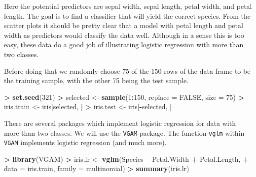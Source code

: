 \documentclass[]{krantz}
\makeatletter
\newenvironment{Shaded}{\begin{snugshade}}{\end{snugshade}}
\newcommand{\DataTypeTok}[1]{\textcolor[rgb]{0.27,0.27,0.27}{#1}}
\newcommand{\DecValTok}[1]{\textcolor[rgb]{0.06,0.06,0.06}{#1}}
\newcommand{\KeywordTok}[1]{\textcolor[rgb]{0.27,0.27,0.27}{\textbf{#1}}}
\newcommand{\NormalTok}[1]{#1}
\newcommand{\OperatorTok}[1]{\textcolor[rgb]{0.43,0.43,0.43}{\textbf{#1}}}
\newcommand{\OtherTok}[1]{\textcolor[rgb]{0.37,0.37,0.37}{#1}}
\newcommand{\StringTok}[1]{\textcolor[rgb]{0.5,0.5,0.5}{#1}}
\newenvironment{kframe}{%
\medskip{}
\setlength{\fboxsep}{.8em}
 \def\at@end@of@kframe{}%
 \ifinner\ifhmode%
  \def\at@end@of@kframe{\end{minipage}}%
  \begin{minipage}{\columnwidth}%
 \fi\fi%
 \def\FrameCommand##1{\hskip\@totalleftmargin \hskip-\fboxsep
 \colorbox{shadecolor}{##1}\hskip-\fboxsep
     \hskip-\linewidth \hskip-\@totalleftmargin \hskip\columnwidth}%
 \MakeFramed {\advance\hsize-\width
   \@totalleftmargin\z@ \linewidth\hsize
   \@setminipage}}%
 {\par\unskip\endMakeFramed%
 \at@end@of@kframe}
\renewenvironment{Shaded}{\begin{kframe}}{\end{kframe}}
\makeatother
\begin{document}
Here the potential predictors are sepal width, sepal length, petal width, and petal length. The goal is to find a classifier that will yield the correct species. From the scatter plots it should be pretty clear that a model with petal length and petal width as predictors would classify the data well. Although in a sense this is too easy, these data do a good job of illustrating logistic regression with more than two classes.

Before doing that we randomly choose 75 of the 150 rows of the data frame to be the training sample, with the other 75 being the test sample.

\begin{Shaded}
\begin{Highlighting}[]
\OperatorTok{>}\StringTok{ }\KeywordTok{set.seed}\NormalTok{(}\DecValTok{321}\NormalTok{)}
\OperatorTok{>}\StringTok{ }\NormalTok{selected <-}\StringTok{ }\KeywordTok{sample}\NormalTok{(}\DecValTok{1}\OperatorTok{:}\DecValTok{150}\NormalTok{, }\DataTypeTok{replace =} \OtherTok{FALSE}\NormalTok{, }\DataTypeTok{size =} \DecValTok{75}\NormalTok{)}
\OperatorTok{>}\StringTok{ }\NormalTok{iris.train <-}\StringTok{ }\NormalTok{iris[selected, ]}
\OperatorTok{>}\StringTok{ }\NormalTok{iris.test <-}\StringTok{ }\NormalTok{iris[}\OperatorTok{-}\NormalTok{selected, ]}
\end{Highlighting}
\end{Shaded}

There are several packages which implement logistic regression for data with more than two classes. We will use the \texttt{VGAM} package. The function \texttt{vglm} within \texttt{VGAM} implements logistic regression (and much more).

\begin{Shaded}
\begin{Highlighting}[]
\OperatorTok{>}\StringTok{ }\KeywordTok{library}\NormalTok{(VGAM)}
\OperatorTok{>}\StringTok{ }\NormalTok{iris.lr <-}\StringTok{ }\KeywordTok{vglm}\NormalTok{(Species }\OperatorTok{~}\StringTok{ }\NormalTok{Petal.Width }\OperatorTok{+}\StringTok{ }\NormalTok{Petal.Length, }
\OperatorTok{+}\StringTok{                 }\DataTypeTok{data =}\NormalTok{ iris.train, }\DataTypeTok{family =}\NormalTok{ multinomial)}
\OperatorTok{>}\StringTok{ }\KeywordTok{summary}\NormalTok{(iris.lr)}
\end{Highlighting}
\end{Shaded}
\end{document}

